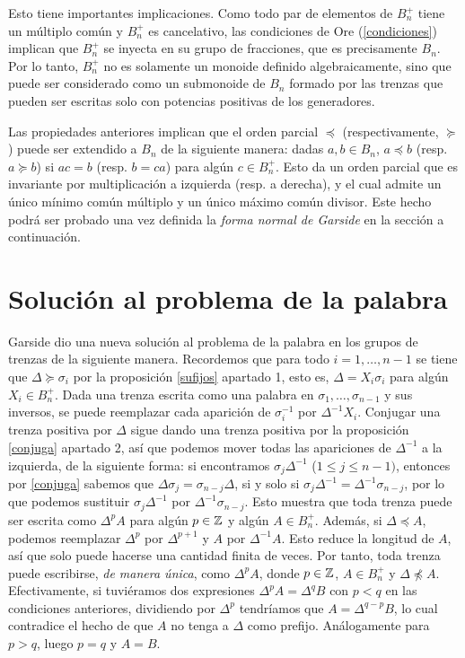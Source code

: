\documentclass[TFG.tex]{subfiles}
\begin{document}

Esto tiene importantes implicaciones. Como todo par de elementos de $B_n^+$ tiene un múltiplo común y $B_n^+$ es cancelativo, las condiciones de Ore (\ref{condiciones}) implican que $B_n^+$ se inyecta en su grupo de fracciones, que es precisamente $B_n$. Por lo tanto, $B_n^+$ no es solamente un monoide definido algebraicamente, sino que puede ser considerado como un submonoide de $B_n$ formado por las trenzas que pueden ser escritas solo con potencias positivas de los generadores. 

Las propiedades anteriores implican que el orden parcial $\preccurlyeq$ (respectivamente, $\succcurlyeq$) puede ser extendido a $B_n$ de la siguiente manera: dadas $a,b\in B_n$, $a\preccurlyeq b$ (resp. $a\succcurlyeq b$) si $ac=b$ (resp. $b=ca$) para algún $c\in B_n^+$. Esto da un orden parcial que es invariante por multiplicación a izquierda (resp. a derecha), y el cual admite un único mínimo común múltiplo y un único máximo común divisor. Este hecho podrá ser probado una vez definida la \emph{forma normal de Garside} en la sección a continuación.

\section{Solución al problema de la palabra}
Garside dio una nueva solución al problema de la palabra en los grupos de trenzas de la siguiente manera. Recordemos que para todo $i=1,\dots, n-1$ se tiene que $\Delta\succcurlyeq\sigma_i$ por la proposición \ref{sufijos} apartado 1, esto es, $\Delta=X_i\sigma_i$ para algún $X_i\in B_n^+$. Dada una trenza escrita como una palabra en $\sigma_1,\dots,\sigma_{n-1}$ y sus inversos, se puede reemplazar cada aparición de $\sigma_i^{-1}$ por $\Delta^{-1}X_i$. Conjugar una trenza positiva por $\Delta$ sigue dando una trenza positiva por la proposición \ref{conjuga} apartado 2, así que podemos mover todas las apariciones de $\Delta^{-1}$ a la izquierda, de la siguiente forma: si encontramos $\sigma_j\Delta^{-1}$ ($1\leq j\leq n-1)$, entonces por \ref{conjuga} sabemos que $\Delta\sigma_{j}=\sigma_{n-j}\Delta$, si y solo si  $\sigma_j\Delta^{-1}=\Delta^{-1}\sigma_{n-j}$, por lo que podemos sustituir $\sigma_j\Delta^{-1}$ por $\Delta^{-1}\sigma_{n-j}$. Esto muestra que toda trenza puede ser escrita como $\Delta^p A$ para algún $p\in\mathbb{Z}$ y algún $A\in B_n^+$. Además, si $\Delta\preccurlyeq A$, podemos reemplazar $\Delta^p$ por $\Delta^{p+1}$ y $A$ por $\Delta^{-1}A$. Esto reduce la longitud de $A$, así que solo puede hacerse una cantidad finita de veces. Por tanto, toda trenza puede escribirse, \emph{de manera única}, como $\Delta^pA$, donde $p\in\mathbb{Z}$, $A\in B_n^+$ y $\Delta\not\preccurlyeq A$. Efectivamente, si tuviéramos dos expresiones $\Delta^pA=\Delta^q B$ con $p<q$ en las condiciones anteriores, dividiendo por $\Delta^p$ tendríamos que $A=\Delta^{q-p}B$, lo cual contradice el hecho de que $A$ no tenga a $\Delta$ como prefijo. Análogamente para $p>q$, luego $p=q$ y $A=B$.
\end{document}
